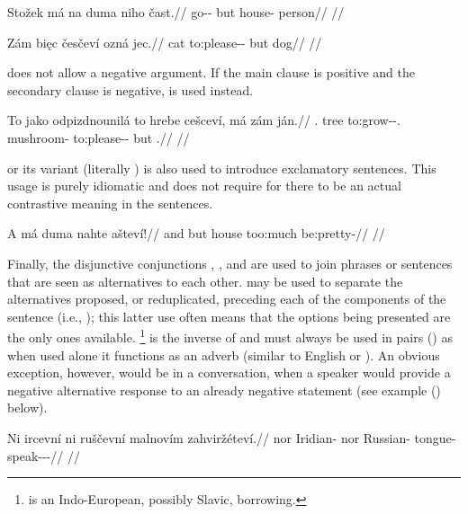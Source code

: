 \pex
\begingl
\gla Stožek má na duma niho čast.//
\glb go-\Av{}-\Pf{} but \Loc{} house-\Acc{}  person//
\glft {}//
\endgl
\xe


\pex[tag=ozna]
\begingl
\gla Zám bi\k{e}c česčeví ozná jec.//
\glb \Neg{} cat to:please-\Av{}-\Cont{} but dog//
\glft {}//
\endgl
\xe

 does not allow a negative argument. If the main clause is positive and the secondary clause is negative,  is used instead.

\pex
\begingl
\gla To jako odpizdnounilá to hrebe cešceví, má zám ján.//
\glb \Dem{}.\Prox{} tree to:grow-\Loc{}-\Subj{}.\Ipf{} \Rz{} mushroom-\Acc{} to:please-\Av{}-\Cont{} but \Neg{} \Dem{}.\Med{}//
\glft {}//
\endgl
\xe

 or its variant  (literally ) is also used to introduce exclamatory sentences. This usage is purely idiomatic and does not require for there to be an actual contrastive meaning in the sentences.

\pex
\begingl
\gla A má duma nahte ašteví!//
\glb and but house too:much be:pretty-\Cont{}//
\glft {}//
\endgl
\xe

Finally, the disjunctive conjunctions , , and  are used to join phrases or sentences that are seen as alternatives to each other.  may be used to separate the alternatives proposed, or reduplicated, preceding each of the components of the sentence (i.e., ); this latter use often means that the options being presented are the only ones available. \footnote{ is an Indo-European, possibly Slavic, borrowing.} is the inverse of  and must always be used in pairs () as when used alone it functions as an adverb (similar to English  or ). An obvious exception, however, would be in a conversation, when a speaker would provide a negative alternative response to an already negative statement (see example () below).

\pex
\begingl
\gla Ni ircevní ni ruščevní malnovím zahviržéteví.//
\glb nor Iridian-\Att{} nor Russian-\Att{} tongue-\Ins{} speak-\Av{}-\Pot{}-\Cont{}//
\glft {}//
\endgl
\xe

